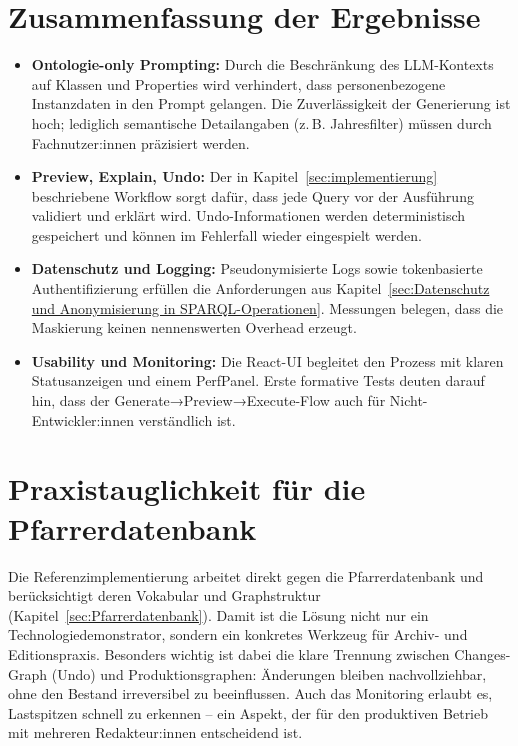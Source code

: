 \section{Zusammenfassung der Ergebnisse}
\begin{itemize}
  \item \textbf{Ontologie-only Prompting:} Durch die Beschränkung des LLM-Kontexts auf Klassen und Properties wird verhindert, dass personenbezogene Instanzdaten in den Prompt gelangen. Die Zuverlässigkeit der Generierung ist hoch; lediglich semantische Detailangaben (z.\,B. Jahresfilter) müssen durch Fachnutzer:innen präzisiert werden.
  \item \textbf{Preview, Explain, Undo:} Der in Kapitel~\ref{sec:implementierung} beschriebene Workflow sorgt dafür, dass jede Query vor der Ausführung validiert und erklärt wird. Undo-Informationen werden deterministisch gespeichert und können im Fehlerfall wieder eingespielt werden.
  \item \textbf{Datenschutz und Logging:} Pseudonymisierte Logs sowie tokenbasierte Authentifizierung erfüllen die Anforderungen aus Kapitel~\ref{sec:Datenschutz und Anonymisierung in SPARQL-Operationen}. Messungen belegen, dass die Maskierung keinen nennenswerten Overhead erzeugt.
  \item \textbf{Usability und Monitoring:} Die React-UI begleitet den Prozess mit klaren Statusanzeigen und einem PerfPanel. Erste formative Tests deuten darauf hin, dass der Generate→Preview→Execute-Flow auch für Nicht-Entwickler:innen verständlich ist.
\end{itemize}

\section{Praxistauglichkeit für die Pfarrerdatenbank}
Die Referenzimplementierung arbeitet direkt gegen die Pfarrerdatenbank und berücksichtigt deren Vokabular und Graphstruktur (Kapitel~\ref{sec:Pfarrerdatenbank}). Damit ist die Lösung nicht nur ein Technologiedemonstrator, sondern ein konkretes Werkzeug für Archiv- und Editionspraxis. Besonders wichtig ist dabei die klare Trennung zwischen Changes-Graph (Undo) und Produktionsgraphen: Änderungen bleiben nachvollziehbar, ohne den Bestand irreversibel zu beeinflussen. Auch das Monitoring erlaubt es, Lastspitzen schnell zu erkennen – ein Aspekt, der für den produktiven Betrieb mit mehreren Redakteur:innen entscheidend ist.

